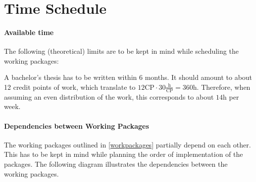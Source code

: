 \documentclass[paper=a4,nochapname,accentcolor=tud9c]{tudexercise}
\begin{document}
\section{Time Schedule}

\paragraph{Available time}
%
The following (theoretical) limits are to be kept in mind while scheduling the
working packages:

A bachelor's thesis has to be written within 6 months.
It should amount to about 12 credit points of work, which translate to $12 \mathrm{CP} \cdot 30 \frac{\mathrm{h}}{\mathrm{CP}} = 360 \mathrm{h}$.
Therefore, when assuming an even distribution of the work, this corresponds to about $14 \mathrm{h}$ per week.

\paragraph{Dependencies between Working Packages}

The working packages outlined in \ref{workpackages} partially depend on each other.
This has to be kept in mind while planning the order of implementation of the
packages. The following diagram illustrates the dependencies between the working packages.

\medskip
\end{document}

